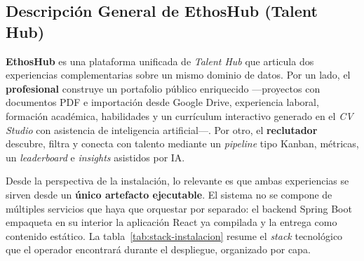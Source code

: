 \subsection{Descripción General de EthosHub (Talent Hub)}%
\label{subsec:descripcion}

\textbf{EthosHub} es una plataforma unificada de \textit{Talent Hub} que articula dos
experiencias complementarias sobre un mismo dominio de datos. Por un lado, el
\textbf{profesional} construye un portafolio público enriquecido —proyectos con
documentos PDF e importación desde Google Drive, experiencia laboral, formación
académica, habilidades y un currículum interactivo generado en el \textit{CV Studio}
con asistencia de inteligencia artificial—. Por otro, el \textbf{reclutador} descubre,
filtra y conecta con talento mediante un \textit{pipeline} tipo Kanban, métricas, un
\textit{leaderboard} e \textit{insights} asistidos por IA.\par

Desde la perspectiva de la instalación, lo relevante es que ambas experiencias se
sirven desde un \textbf{único artefacto ejecutable}. El sistema no se compone de
múltiples servicios que haya que orquestar por separado: el backend Spring Boot empaqueta
en su interior la aplicación React ya compilada y la entrega como contenido estático.
La tabla~\ref{tab:stack-instalacion} resume el \textit{stack} tecnológico que el operador
encontrará durante el despliegue, organizado por capa.\par

